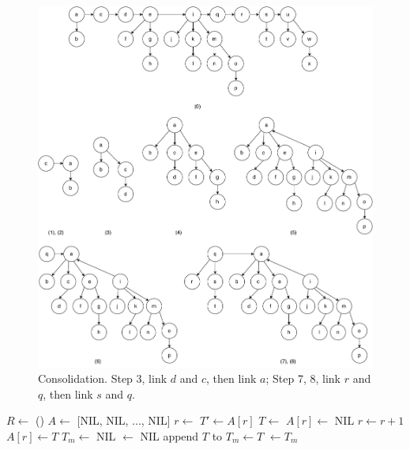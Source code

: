 \documentclass[b5paper]{article}
\begin{document}
\captionsetup[subfigure]{labelformat=empty, margin=10pt}
\begin{figure}[htbp]
  \centering
  \includegraphics[scale=0.45]{img/fib-meld}
  \caption{Consolidation. Step 3, link $d$ and $c$, then link $a$; Step 7, 8, link $r$ and $q$, then link $s$ and $q$.}
  \label{fig:fib-meld-b}
\end{figure}
\captionsetup[subfigure]{labelformat=parens}

\begin{algorithmic}[1]
  \State $R \gets $ ()
  \State $A \gets$ [NIL, NIL, ..., NIL] 
    \State $r \gets $ 
      \State $T' \gets A[r]$
      \State $T \gets $ 
      \State $A[r] \gets$ NIL
      \State $r \gets r + 1$
    \EndWhile
    \State $A[r] \gets T$
  \EndFor
  \State $T_m \gets$ NIL
  \State {} $\gets$ NIL
      \State append $T$ to 
        \State $T_m \gets T$
      \EndIf
    \EndIf
  \EndFor
  \State {} $\gets T_m$
\EndFunction
\end{algorithmic}
\end{document}

